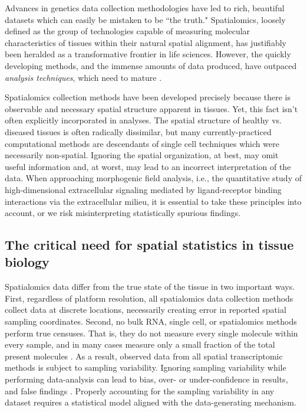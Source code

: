 \documentclass[10pt,letterpaper]{article}
\begin{document}
Advances in genetics data collection methodologies have led to rich, beautiful datasets which can easily be mistaken to be ``the truth."  Spatialomics, loosely defined as the group of technologies capable of measuring molecular characteristics of tissues within their natural spatial alignment, has justifiably been heralded as a transformative frontier in life sciences. However, the quickly developing methods, and the immense amounts of data produced, have outpaced \textit{analysis techniques}, which need to mature \cite{bressan2023}.

Spatialomics collection methods have been developed precisely because there is observable and necessary spatial structure apparent in tissues. Yet, this fact isn't often explicitly incorporated in analyses. The spatial structure of healthy vs. diseased tissues is often radically dissimilar, but many currently-practiced computational methods are descendants of single cell techniques which were necessarily non-spatial. Ignoring the spatial organization, at best, may omit useful information and, at worst, may lead to an incorrect interpretation of the data. When approaching morphogenic field analysis, i.e., the quantitative study of high-dimensional extracellular signaling mediated by ligand-receptor binding interactions via the extracellular milieu, it is essential to take these principles into account, or we risk misinterpreting statistically spurious findings.

\subsection*{The critical need for spatial statistics in tissue biology}

Spatialomics data differ from the true state of the tissue in two important ways. First, regardless of platform resolution, all spatialomics data collection methods collect data at discrete locations, necessarily creating error in reported spatial sampling coordinates. Second, no bulk RNA, single cell, or spatialomics methods perform true censuses. That is, they do not measure every single molecule within every sample, and in many cases measure only a small fraction of the total present molecules \cite{Yue2023,Wang2023}. As a result, observed data from all spatial transcriptomic methods is subject to sampling variability. Ignoring sampling variability while performing data-analysis can lead to bias, over- or under-confidence in results, and false findings \cite{li2019a}. Properly accounting for the sampling variability in any dataset requires a statistical model aligned with the data-generating mechanism.
\end{document}
